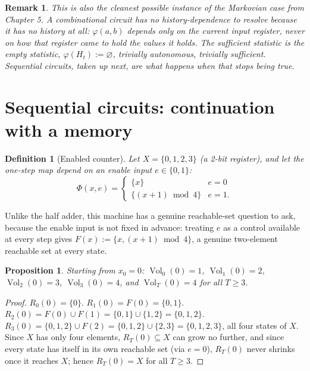 \documentclass[11pt]{report}
\newtheorem{proposition}{Proposition}[chapter]
\newtheorem{definition}{Definition}[chapter]
\newtheorem{remark}{Remark}[chapter]
\begin{document}
\begin{remark}
This is also the cleanest possible instance of the Markovian case from
Chapter 5. A combinational circuit has no history-dependence to
resolve because it has no history at all: $\varphi(a,b)$ depends only
on the current input register, never on how that register came to hold
the values it holds. The sufficient statistic is the empty statistic,
$\varphi(H_t) := \varnothing$, trivially autonomous, trivially
sufficient. Sequential circuits, taken up next, are what happens when
that stops being true.
\end{remark}

\section*{Sequential circuits: continuation with a memory}

\begin{definition}[Enabled counter]
Let $X = \{0,1,2,3\}$ (a 2-bit register), and let the one-step map
depend on an enable input $e \in \{0,1\}$:
\[
\Phi(x, e) = \begin{cases} \{x\} & e = 0 \\ \{(x+1) \bmod 4\} & e = 1. \end{cases}
\]
\end{definition}

Unlike the half adder, this machine has a genuine reachable-set
question to ask, because the enable input is not fixed in advance:
treating $e$ as a control available at every step gives
$F(x) := \{x, (x+1) \bmod 4\}$, a genuine two-element reachable set at
every state.

\begin{proposition}
Starting from $x_0 = 0$: $\operatorname{Vol}_0(0) = 1$,
$\operatorname{Vol}_1(0) = 2$, $\operatorname{Vol}_2(0) = 3$,
$\operatorname{Vol}_3(0) = 4$, and $\operatorname{Vol}_T(0) = 4$ for
all $T \geq 3$.
\end{proposition}
\begin{proof}
$R_0(0) = \{0\}$. $R_1(0) = F(0) = \{0,1\}$. $R_2(0) = F(0) \cup F(1) =
\{0,1\} \cup \{1,2\} = \{0,1,2\}$. $R_3(0) = \{0,1,2\} \cup F(2) =
\{0,1,2\} \cup \{2,3\} = \{0,1,2,3\}$, all four states of $X$. Since
$X$ has only four elements, $R_T(0) \subseteq X$ can grow no further,
and since every state has itself in its own reachable set (via
$e = 0$), $R_T(0)$ never shrinks once it reaches $X$; hence
$R_T(0) = X$ for all $T \geq 3$.
\end{proof}
\end{document}
